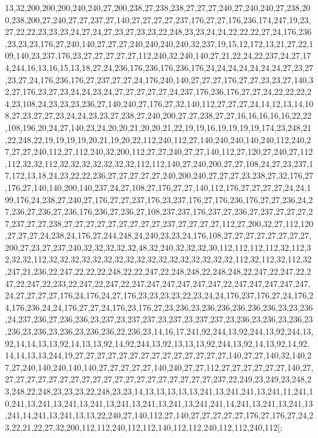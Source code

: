13,32,200,200,200,240,240,27,200,238,27,238,238,27,27,27,240,27,240,240,27,238,200,238,200,27,240,27,27,237,27,140,27,27,27,27,237,176,27,27,176,236,174,247,19,23,27,22,22,23,23,23,24,27,24,27,23,27,23,23,22,248,23,23,24,24,22,22,22,27,24,176,236,23,23,23,176,27,240,140,27,27,27,240,240,240,240,32,237,19,15,12,172,13,21,27,22,109,140,23,237,176,23,27,27,27,27,27,112,240,32,240,140,27,21,22,24,22,237,24,27,174,244,16,13,16,15,13,18,27,24,236,176,236,176,236,176,24,24,24,24,24,24,24,27,23,27,23,27,24,176,236,176,27,237,27,27,24,176,240,140,27,27,27,176,27,27,23,23,27,140,32,27,176,23,27,23,24,24,23,24,27,27,27,27,27,24,237,176,236,176,27,27,24,22,22,22,24,23,108,24,23,23,23,236,27,140,240,27,176,27,32,140,112,27,27,27,24,14,12,13,14,108,27,23,27,27,23,24,24,23,23,27,238,27,240,200,27,27,238,27,27,16,16,16,16,16,22,22,108,196,20,24,27,140,23,24,20,20,21,20,20,21,22,19,19,16,19,19,19,19,174,23,248,21,22,248,22,19,19,19,19,20,21,19,20,22,112,240,112,27,140,240,240,140,240,112,240,27,27,27,240,112,27,112,240,32,200,112,27,27,240,27,27,140,112,27,120,27,240,27,112,112,32,32,112,32,32,32,32,32,32,32,112,112,140,27,240,200,27,27,108,24,27,23,237,17,172,13,18,24,23,22,22,236,27,27,27,27,27,240,200,240,27,27,27,23,238,27,32,176,27,176,27,140,140,200,140,237,24,27,108,27,176,27,27,140,112,176,27,27,27,27,24,24,199,176,24,238,27,240,27,176,27,27,237,176,23,237,176,27,176,236,176,27,27,236,24,27,236,27,236,27,236,176,236,27,236,27,108,237,237,176,237,27,236,27,237,27,27,27,27,237,27,27,238,27,27,27,27,27,27,27,27,27,237,27,27,27,27,112,27,200,32,27,112,120,27,27,27,24,238,24,176,27,244,248,24,240,23,23,24,176,108,27,27,27,27,27,27,27,27,200,27,23,27,237,240,32,32,32,32,32,48,32,240,32,32,32,30,112,112,112,112,32,112,32,32,32,112,32,32,32,32,32,32,32,32,32,32,32,32,32,32,32,32,32,112,32,112,32,112,32,247,21,236,22,247,22,22,22,248,22,22,247,22,248,248,22,248,248,22,247,22,247,22,247,22,247,22,233,22,247,22,247,22,247,247,247,247,247,247,22,247,247,247,247,247,24,27,27,27,27,176,24,176,24,27,176,23,23,23,23,22,23,24,24,176,237,176,27,24,176,24,176,236,24,24,176,27,27,24,176,23,176,27,23,236,23,236,236,236,236,236,23,23,236,24,237,236,27,236,236,23,237,23,237,237,23,237,23,237,237,23,236,23,236,23,236,23,236,23,236,23,236,23,236,236,22,236,23,14,16,17,241,92,244,13,92,244,13,92,244,13,92,14,14,13,13,92,14,13,13,92,14,92,244,13,92,13,13,13,92,244,13,92,14,13,92,14,92,14,14,13,13,244,19,27,27,27,27,27,27,27,27,27,27,27,27,27,27,140,27,27,140,32,140,27,27,240,140,240,140,140,27,27,27,27,27,140,240,27,27,112,27,27,27,27,27,27,140,27,27,27,27,27,27,27,27,27,27,27,27,27,27,27,27,27,27,27,27,237,22,249,23,249,23,248,23,248,22,248,23,23,23,22,248,23,23,14,13,13,13,13,13,241,13,241,241,13,241,11,241,10,241,13,241,13,241,13,241,13,241,13,241,13,241,13,241,241,14,241,13,241,13,241,13,241,14,241,13,241,13,13,22,240,27,140,112,27,140,27,27,27,27,27,176,27,176,27,24,23,22,21,22,27,32,200,112,112,240,112,112,140,112,112,240,112,112,240,112];


